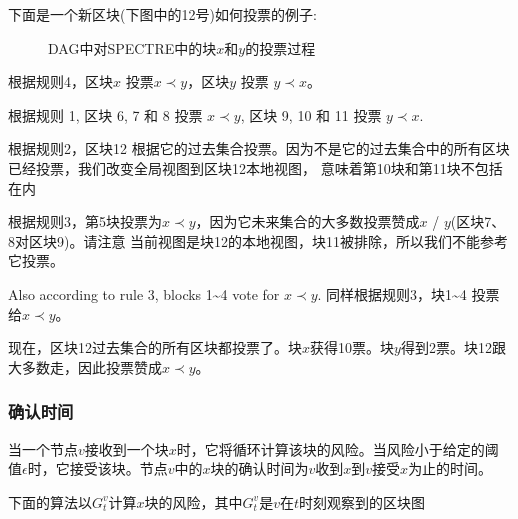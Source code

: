\documentclass[a4paper,11pt]{article}
\begin{document}
下面是一个新区块(下图中的12号)如何投票的例子:

\begin{figure}[ht]
	\centerline{%
	}
\caption{DAG中对SPECTRE中的块$x$和$y$的投票过程}
\end{figure}

根据规则4，区块$x$ 投票$x \prec y$，区块$y$ 投票 $y \prec x$。

根据规则 1, 区块 6, 7 和 8 投票 $x \prec y$, 区块 9, 10 和 11 投票 $y \prec x$.


根据规则2，区块12 根据它的过去集合投票。因为不是它的过去集合中的所有区块已经投票，我们改变全局视图到区块12本地视图，
意味着第10块和第11块不包括在内


根据规则3，第5块投票为$x \prec y$，因为它未来集合的大多数投票赞成$x$ / $y$(区块7、8对区块9)。请注意
当前视图是块12的本地视图，块11被排除，所以我们不能参考它投票。

Also according to rule 3, blocks 1\textasciitilde4 vote for $x \prec y$.
同样根据规则3，块1\textasciitilde4 投票给$x \prec y$。


现在，区块12过去集合的所有区块都投票了。块$x$获得10票。块$y$得到2票。块12跟大多数走，因此投票赞成$x \prec y$。


\subsubsection*{确认时间}


当一个节点$v$接收到一个块$x$时，它将循环计算该块的风险。当风险小于给定的阈值$\epsilon$时，它接受该块。节点$v$中的$x$块的确认时间为$v$收到$x$到$v$接受$x$为止的时间。

下面的算法以$G_t^v$计算$x$块的风险，其中$G_t^v$是$v$在$t$时刻观察到的区块图
\end{document}
